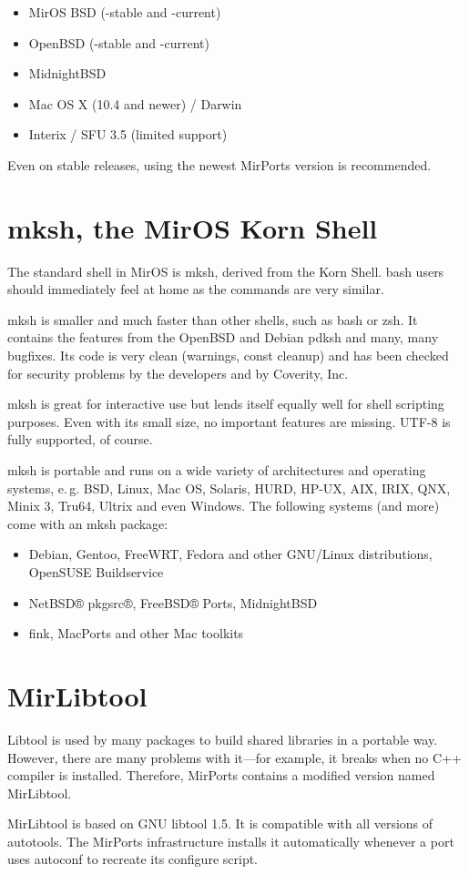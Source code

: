 \documentclass[a4paper,landscape,11pt,notumble]{leaflet}
\begin{document}
\begin{itemize}
\item MirOS BSD (-stable and -current)
\item OpenBSD (-stable and -current)
\item MidnightBSD
\item Mac OS X (10.4 and newer) / Darwin
\item Interix / SFU 3.5 (limited support)
\end{itemize}

\noindent
Even on stable releases, using the newest MirPorts version is recommended. 

\newpage

\section{mksh, the MirOS Korn Shell}

The standard shell in MirOS is mksh, derived from the Korn Shell. bash users should immediately feel at home as the commands are very similar.

mksh is smaller and much faster than other shells, such as bash or zsh. It contains the features from the OpenBSD and Debian pdksh and many, many bugfixes. Its code is very clean (warnings, const cleanup) and has been checked for security problems by the developers and by Coverity, Inc.

mksh is great for interactive use but lends itself equally well for shell scripting purposes. Even with its small size, no important features are missing. UTF-8 is fully supported, of course.

mksh is portable and runs on a wide variety of architectures and operating systems, e.\,g. BSD, Linux, Mac OS, Solaris, HURD, HP-UX, AIX, IRIX, QNX, Minix 3, Tru64, Ultrix and even Windows. The following systems (and more) come with an mksh package:

\begin{itemize}
\item Debian, Gentoo, FreeWRT, Fedora and other GNU/Linux distributions, OpenSUSE Buildservice
\item NetBSD® pkgsrc®, FreeBSD® Ports, MidnightBSD
\item fink, MacPorts and other Mac toolkits
\end{itemize}

\section{MirLibtool}

Libtool is used by many packages to build shared libraries in  a portable way. However, there are many problems with it—for example, it breaks when no C++ compiler is installed. Therefore, MirPorts contains a modified version named MirLibtool.

MirLibtool is based on GNU libtool 1.5. It is compatible with all versions of autotools. The MirPorts infrastructure installs it automatically whenever a port uses autoconf to recreate its configure script.
\end{document}

